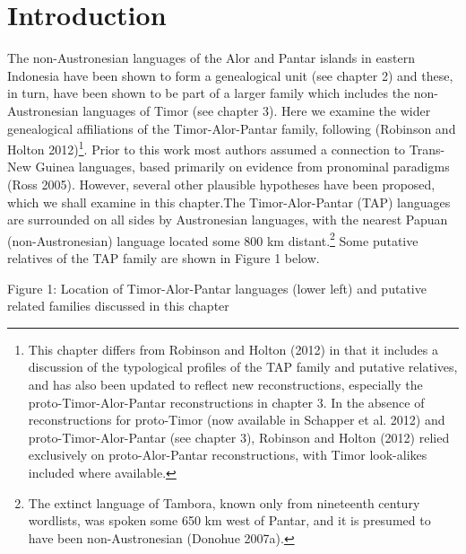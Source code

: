 \section[Introduction]{Introduction}
\hypertarget{RefHeading72062871885726}{}\hypertarget{Toc376958109}{}The non-Austronesian languages of the Alor and Pantar islands in eastern Indonesia have been shown to form a genealogical unit (see chapter 2) and these, in turn, have been shown to be part of a larger family which includes the non-Austronesian languages of Timor (see chapter 3). Here we examine the wider genealogical affiliations of the Timor-Alor-Pantar family, following (Robinson and Holton 2012)\footnote{ This chapter differs from Robinson and Holton (2012) in that it includes a discussion of the typological profiles of the TAP family and putative relatives, and has also been updated to reflect new reconstructions, especially the proto-Timor-Alor-Pantar reconstructions in chapter 3. In the absence of reconstructions for proto-Timor (now available in Schapper et al. 2012) and proto-Timor-Alor-Pantar (see chapter 3), Robinson and Holton (2012) relied exclusively on proto-Alor-Pantar reconstructions, with Timor look-alikes included where 
available. }. Prior to this work most authors assumed a connection to Trans-New Guinea languages, based primarily on evidence from pronominal paradigms (Ross 2005). However, several other plausible hypotheses have been proposed, which we shall examine in this chapter.The Timor-Alor-Pantar (TAP) languages are surrounded on all sides by Austronesian languages, with the nearest Papuan (non-Austronesian) language located some 800 km distant.\footnote{ The extinct language of Tambora, known only from nineteenth century wordlists, was spoken some 650 km west of Pantar, and it is presumed to have been non-Austronesian (Donohue 2007a).} Some putative relatives of the TAP family are shown in Figure 1 below.

{\centering
Figure 1: Location of Timor-Alor-Pantar languages (lower left) and putative related families discussed in this chapter
\par}

{%
 \par}

